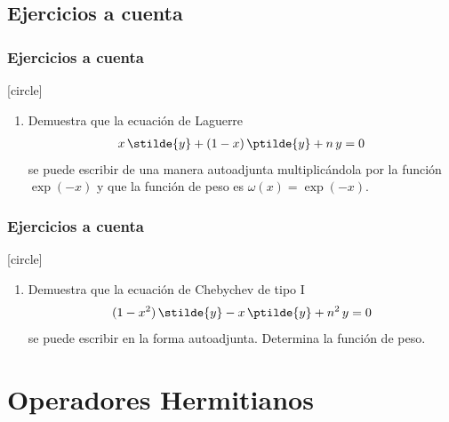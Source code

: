 \subsection{Ejercicios a cuenta}
\begin{frame}
\frametitle{Ejercicios a cuenta}
[circle]
\begin{enumerate}
\item Demuestra que la ecuación de Laguerre
\begin{align*}
x \, \stilde{y} + (1 - x) \, \ptilde{y} + n \, y = 0
\end{align*}
se puede escribir de una manera autoadjunta multiplicándola por la función $\exp(-x)$ y que la función de peso es $\omega(x) = \exp(-x)$.
\seti
\end{enumerate}
\end{frame}
\begin{frame}
\frametitle{Ejercicios a cuenta}
[circle]
\begin{enumerate}
\conti    
\item Demuestra que la ecuación de Chebychev de tipo I
\begin{align*}
(1 -x^{2}) \, \stilde{y} - x \, \ptilde{y} + n^{2} \, y = 0
\end{align*}
se puede escribir en la forma autoadjunta. Determina la función de peso.
\end{enumerate}
\end{frame}
\section{Operadores Hermitianos}
